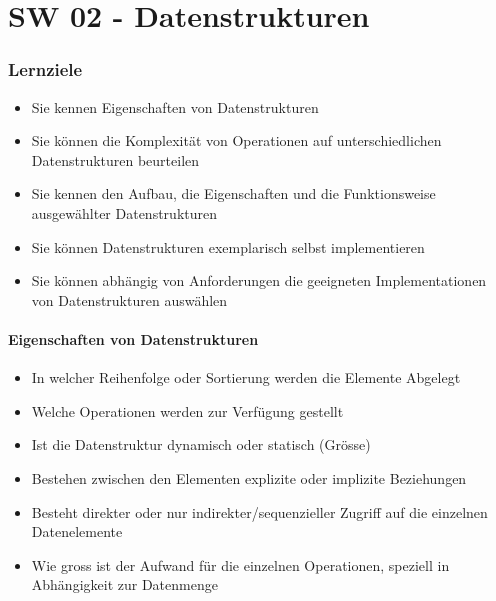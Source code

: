 \part{SW 02 - Datenstrukturen}
\section{Lernziele}
\begin{itemize}[noitemsep,topsep=0pt,leftmargin=*]
    \item Sie kennen Eigenschaften von Datenstrukturen
    \item Sie können die Komplexität von Operationen auf unterschiedlichen Datenstrukturen beurteilen
    \item Sie kennen den Aufbau, die Eigenschaften und die Funktionsweise ausgewählter Datenstrukturen
    \item Sie können Datenstrukturen exemplarisch selbst implementieren
    \item Sie können abhängig von Anforderungen die geeigneten Implementationen von Datenstrukturen auswählen
\end{itemize}

\subsection{Eigenschaften von Datenstrukturen}
\begin{itemize}[noitemsep,topsep=0pt,leftmargin=*]
    \item In welcher Reihenfolge oder Sortierung werden die Elemente Abgelegt
    \item Welche Operationen werden zur Verfügung gestellt
    \item Ist die Datenstruktur dynamisch oder statisch (Grösse)
    \item Bestehen zwischen den Elementen explizite oder implizite Beziehungen
    \item Besteht direkter oder nur indirekter/sequenzieller Zugriff auf die einzelnen Datenelemente
    \item Wie gross ist der Aufwand für die einzelnen Operationen, speziell in Abhängigkeit zur Datenmenge
\end{itemize}

